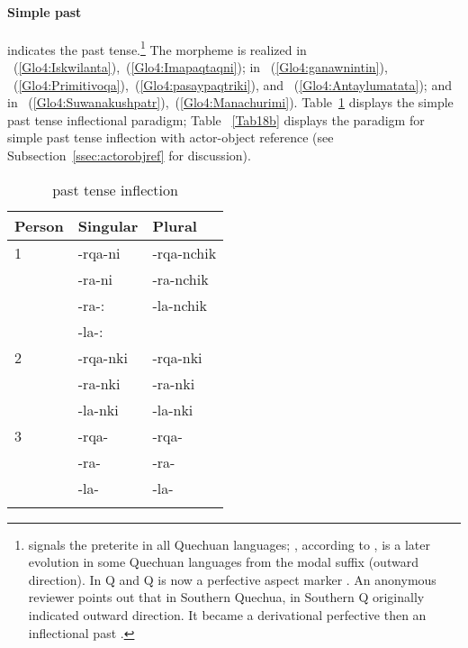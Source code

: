 \paragraph{Simple past }\label{par:simplepast}
 indicates the past tense.\footnote{ signals the preterite in all Quechuan languages; , according to \citet{CerroP87}, is a later evolution in some Quechuan languages from the modal suffix  (outward direction). In  Q and  Q  is now a perfective aspect marker \citet[18--29]{Adelaar88}. An anonymous reviewer points out that in Southern  Quechua,  in Southern  Q originally indicated outward direction. It became a derivational perfective then an inflectional past \citep[see][192--197]{Hintz}.} The morpheme is realized  in \AMV{}~(\ref{Glo4:Iskwilanta}),~(\ref{Glo4:Imapaqtaqni});  in \ACH{}~(\ref{Glo4:ganawnintin}), \LT{}~(\ref{Glo4:Primitivoqa}),~(\ref{Glo4:pasaypaqtriki}), and \SP{}~(\ref{Glo4:Antaylumatata}); and  in \CH{}~(\ref{Glo4:Suwanakushpatr}),~(\ref{Glo4:Manachurimi}). Table~\ref{Tab18a} displays the simple past tense inflectional paradigm; Table ~\ref{Tab18b} displays the paradigm for simple past tense inflection with actor-object reference (see Subsection~\ref{ssec:actorobjref} for discussion).


\begin{table}
\small\centering
\caption{past tense inflection}\label{Tab18a}
\begin{tabular}{lll}
\lsptoprule
Person		& Singular		& Plural			\\
\midrule
1	& -rqa-ni\tss{\AMV}		& -rqa-nchik\tss{\AMV}		\\
	& -ra-ni\tss{\LT}		& -ra-nchik\tss{\ACH,\SP,\LT}	\\
	& -ra-:\tss{\ACH,\SP}		& -la-nchik\tss{\CH}		\\
	& -la-:\tss{\CH}		&	\\[2ex]
2	& -rqa-nki\tss{\AMV}		& -rqa-nki\tss{\AMV}		\\
	& -ra-nki\tss{\ACH,\SP,\LT}	& -ra-nki\tss{\ACH,\SP,\LT}	\\
	& -la-nki\tss{\CH}		& -la-nki\tss{\CH}		\\[2ex]
3	& -rqa-\uo\tss{\AMV}		& -rqa-\uo\tss{\AMV}		\\
	& -ra-\uo\tss{\ACH,\SP,\LT}	& -ra-\uo\tss{\ACH,\SP,\LT}	\\
	& -la-\uo\tss{\CH}		& -la-\uo\tss{\CH}		\\
\lspbottomrule
\end{tabular}
\end{table}

